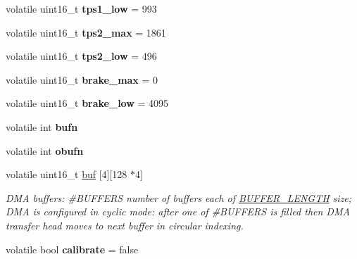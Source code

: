 \begin{DoxyCompactItemize}
volatile uint16\+\_\+t {\bfseries tps1\+\_\+low} = 993
\item 
\mbox{\label{group___board__model__group_ga53381436ea8db96c356db8b305bec988}} 
volatile uint16\+\_\+t {\bfseries tps2\+\_\+max} = 1861
\item 
\mbox{\label{group___board__model__group_gab03e92ec2b5f742e5a147a6589d3975e}} 
volatile uint16\+\_\+t {\bfseries tps2\+\_\+low} = 496
\item 
\mbox{\label{group___board__model__group_ga744857a9bc060647cfc4ad47017c5bee}} 
volatile uint16\+\_\+t {\bfseries brake\+\_\+max} = 0
\item 
\mbox{\label{group___board__model__group_gaaf843a7e652e5cf9b270d0b211be937c}} 
volatile uint16\+\_\+t {\bfseries brake\+\_\+low} = 4095
\item 
\mbox{\label{group___board__model__group_gad2658b77f345b15c03759c02d1ba0e81}} 
volatile int {\bfseries bufn}
\item 
\mbox{\label{group___board__model__group_gafef4d6ed48b3edc5f7a74defba82e7d8}} 
volatile int {\bfseries obufn}
\item 
\mbox{\label{group___board__model__group_gabaadbcc3b48e8ec3798741a74a672046}} 
volatile uint16\+\_\+t \mbox{\hyperlink{group___board__model__group_gabaadbcc3b48e8ec3798741a74a672046}{buf}} \mbox{[}4\mbox{]}\mbox{[}128 $\ast$4\mbox{]}
\begin{DoxyCompactList}\small\item\em D\+MA buffers\+: \#\+B\+U\+F\+F\+E\+RS number of buffers each of \mbox{\hyperlink{group___board__model__group_gaf7b7dc9a200cb1404c280bd500fd1551}{B\+U\+F\+F\+E\+R\+\_\+\+L\+E\+N\+G\+TH}} size; D\+MA is configured in cyclic mode\+: after one of \#\+B\+U\+F\+F\+E\+RS is filled then D\+MA transfer head moves to next buffer in circular indexing. \end{DoxyCompactList}\item 
\mbox{\label{group___board__model__group_ga481292a7bd814aefcdc2deb9872f5421}} 
volatile bool {\bfseries calibrate} = false
\end{DoxyCompactItemize}


